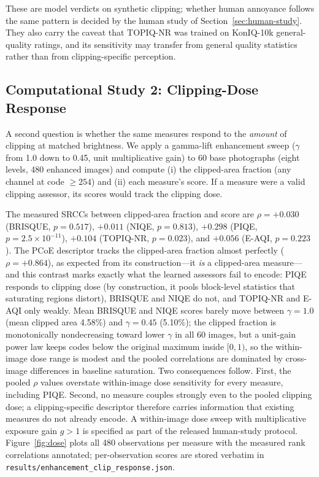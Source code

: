 \documentclass[5p,times,twocolumn]{elsarticle}
\begin{document}
These are model verdicts on synthetic clipping; whether human annoyance
follows the same pattern is decided by the human study of
Section~\ref{sec:human-study}. They also carry the caveat that TOPIQ-NR was
trained on
KonIQ-10k general-quality ratings, and its sensitivity may transfer from
general quality statistics rather than from clipping-specific perception.

\subsection{Computational Study 2: Clipping-Dose Response}
\label{sec:study2}

A second question is whether the same measures respond to the \emph{amount}
of clipping at matched brightness. We apply a gamma-lift enhancement sweep
($\gamma$ from 1.0 down to 0.45, unit multiplicative gain) to 60 base
photographs (eight levels, 480 enhanced images) and compute (i) the
clipped-area fraction (any channel at code $\ge 254$) and (ii) each measure's
score. If a measure were a valid clipping assessor, its scores would track the
clipping dose.

The measured SRCCs between clipped-area fraction and score are
$\rho = +0.030$ (BRISQUE, $p = 0.517$), $+0.011$ (NIQE, $p = 0.813$), $+0.298$
(PIQE, $p = 2.5 \times 10^{-11}$), $+0.104$ (TOPIQ-NR, $p = 0.023$), and
$+0.056$ (E-AQI, $p = 0.223$). The PCoE descriptor tracks the clipped-area
fraction almost perfectly ($\rho = +0.864$), as expected from its
construction---it \emph{is} a clipped-area measure---and this contrast marks
exactly what the learned assessors fail to encode: PIQE responds to clipping
dose (by construction, it pools block-level
statistics that saturating regions distort), BRISQUE and NIQE do not, and
TOPIQ-NR and E-AQI only weakly. Mean BRISQUE and NIQE scores barely move between
$\gamma = 1.0$ (mean clipped area 4.58\%) and $\gamma = 0.45$ (5.10\%); the
clipped fraction is monotonically nondecreasing toward lower $\gamma$ in all
60 images, but a unit-gain power law keeps codes below the original maximum
inside $[0, 1)$, so the within-image dose range is modest and the pooled
correlations are dominated by cross-image differences in baseline saturation.
Two consequences follow. First, the pooled $\rho$ values overstate
within-image dose sensitivity for every measure, including PIQE. Second, no
measure couples strongly even to the pooled clipping dose; a
clipping-specific descriptor therefore carries information that existing
measures do not already encode. A within-image dose sweep with multiplicative
exposure gain $g > 1$ is specified as part of the released human-study
protocol. Figure~\ref{fig:dose} plots all 480 observations per measure with
the measured rank correlations annotated; per-observation scores are stored
verbatim in \texttt{results/enhancement\_clip\_response.json}.
\end{document}
